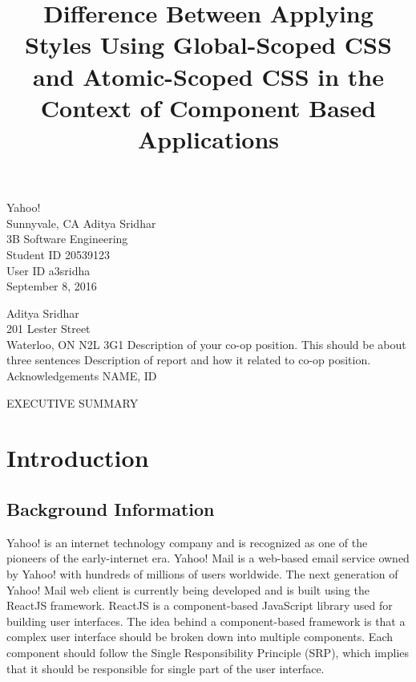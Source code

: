 \documentclass[12pt]{article}
\begin{document}
\title{Difference Between Applying Styles Using Global-Scoped CSS and Atomic-Scoped CSS in the Context of Component Based Applications}
{
	Yahoo!\\
	Sunnyvale, CA
}
{
	Aditya Sridhar\\
	3B Software Engineering\\
	Student ID 20539123\\
	User ID a3sridha\\
	September 8, 2016
}


{
	\noindent
	Aditya Sridhar\\
	201 Lester Street\\
	Waterloo, ON N2L 3G1
}
{
	Description of your co-op position. This should be about three sentences
}
{
	Description of report and how it related to co-op position.
}
{
	Acknowledgements
}
{
	NAME, ID
}


EXECUTIVE SUMMARY
\newpage




\toc


\section{Introduction}
\subsection{Background Information}
Yahoo! is an internet technology company and is recognized as one of the pioneers of the early-internet era. Yahoo! Mail is a web-based email service owned by Yahoo! with hundreds of millions of users worldwide. The next generation of Yahoo! Mail web client is currently being developed and is built using the ReactJS framework. ReactJS is a component-based JavaScript library used for building user interfaces. The idea behind a component-based framework is that a complex user interface should be broken down into multiple components. Each component should follow the Single Responsibility Principle (SRP), which implies that it should be responsible for single part of the user interface.
\end{document}
